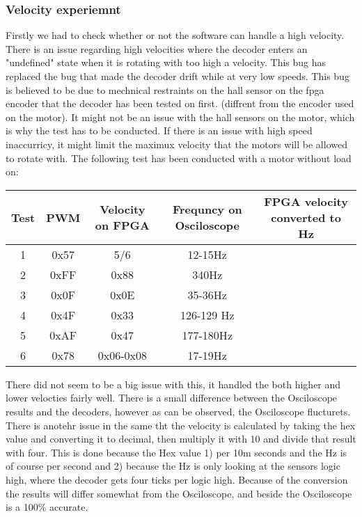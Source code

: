 \documentclass[../main]{subfiles}
\begin{document}
\subsubsection*{Velocity experiemnt}
Firstly we had to check whether or not the software can handle a high velocity. There is an issue regarding high velocities where the decoder enters an "undefined" state when it is rotating with too high a velocity. This bug has replaced the bug that made the decoder drift while at very low speeds. This bug is believed to be due to mechnical restraints on the hall sensor on the fpga encoder that the decoder has been tested on first.  (diffrent from the encoder used on the motor). It might not be an issue with the hall sensors on the motor, which is why the test has to be conducted. If there is an issue with high speed inaccurricy, it might limit the maximux velocity that the motors will be allowed to rotate with. The following test has been conducted with a motor without load on:
\begin{center}
\begin{tabular}{ c c c c c}
 Test & PWM & Velocity on FPGA & Frequncy on Osciloscope & FPGA velocity converted to Hz\\
 \hline

 1 & 0x57 & 5/6 & 12-15Hz &\\
 2 & 0xFF & 0x88 & 340Hz &\\
 3 & 0x0F & 0x0E  & 35-36Hz & \\
 4 & 0x4F & 0x33 & 126-129 Hz &\\
 5 & 0xAF & 0x47 & 177-180Hz &\\
 6 & 0x78 & 0x06-0x08 & 17-19Hz & \\
\end{tabular}
\end{center}
There did not seem to be a big issue with this, it handled the both higher and lower velocties fairly well. There is a small difference between the Osciloscope results and the decoders, however as can be observed, the Osciloscope flucturets. There is anotehr issue in the same tht the velocity is calculated by taking the hex value and converting it to decimal, then multiply it with 10 and divide that result with four. This is done because the Hex value 1) per 10m seconds and the Hz is of course per second and 2) because the Hz is only looking at the sensors logic high, where the decoder gets four ticks per logic high. Because of the conversion the results will differ somewhat from the Osciloscope, and beside the Osciloscope is a 100\% accurate.
\\
\end{document}
